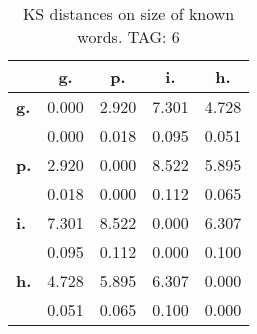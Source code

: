\begin{table}[h!]
\begin{center}
\begin{tabular}{| l || c | c | c | c |}\hline
 & {\bf g.} & {\bf p.} & {\bf i.} & {\bf h.} \\\hline\hline
{\bf g.} & 0.000 & 2.920 & 7.301 & 4.728 \\
{\bf } & 0.000 & 0.018 & 0.095 & 0.051 \\\hline
{\bf p.} & 2.920 & 0.000 & 8.522 & 5.895 \\
{\bf } & 0.018 & 0.000 & 0.112 & 0.065 \\\hline
{\bf i.} & 7.301 & 8.522 & 0.000 & 6.307 \\
{\bf } & 0.095 & 0.112 & 0.000 & 0.100 \\\hline
{\bf h.} & 4.728 & 5.895 & 6.307 & 0.000 \\
{\bf } & 0.051 & 0.065 & 0.100 & 0.000 \\\hline
\end{tabular}
\caption{KS distances on size of known words. TAG: 6}
\end{center}
\end{table}